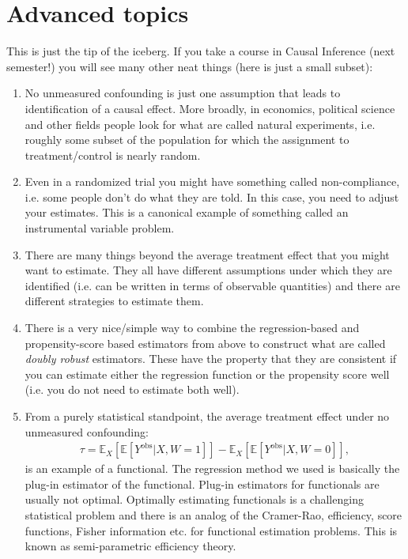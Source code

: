\documentclass[twoside,12pt]{article}
\begin{document}
\section{Advanced topics}
This is just the tip of the iceberg. If you take a course in Causal Inference (next semester!) you will see many other neat things (here is just a small subset):
\begin{enumerate}
\item No unmeasured confounding is just one assumption that leads to identification of a causal effect. More broadly, in economics, political science and other fields people look for what are called natural experiments, i.e. roughly some subset of the population for which the assignment to treatment/control is nearly random.

\item Even in a randomized trial you might have something called non-compliance, i.e. some people don't do what they are told. In this case, you need to adjust your estimates. This is a canonical example of something called an instrumental variable problem. 


\item There are many things beyond the average treatment effect that you might want to estimate. They all have different assumptions under which they are identified (i.e. can be written in terms of observable quantities) and there are different strategies to estimate them. 

\item There is a very nice/simple way to combine the regression-based and propensity-score based estimators from above to construct what are called \emph{doubly robust} estimators. These have the property that they are consistent if you can estimate either the regression function or the propensity score well (i.e. you do not need to estimate both well).

\item From a purely statistical standpoint, the average treatment effect under no unmeasured confounding:
\begin{align*}
\tau =  \mathbb{E}_X[\mathbb{E} [Y^{\text{obs}} | X, W = 1]] -  \mathbb{E}_X[\mathbb{E} [Y^{\text{obs}}  | X, W = 0]],
\end{align*}
is an example of a functional. The regression method we used is basically the plug-in estimator of the functional. Plug-in estimators for functionals are usually not optimal. Optimally estimating functionals is a challenging statistical problem and there is an analog of the Cramer-Rao, efficiency, score functions, Fisher information etc. for functional estimation problems. This is known as semi-parametric efficiency theory.


\end{enumerate}
\end{document}
